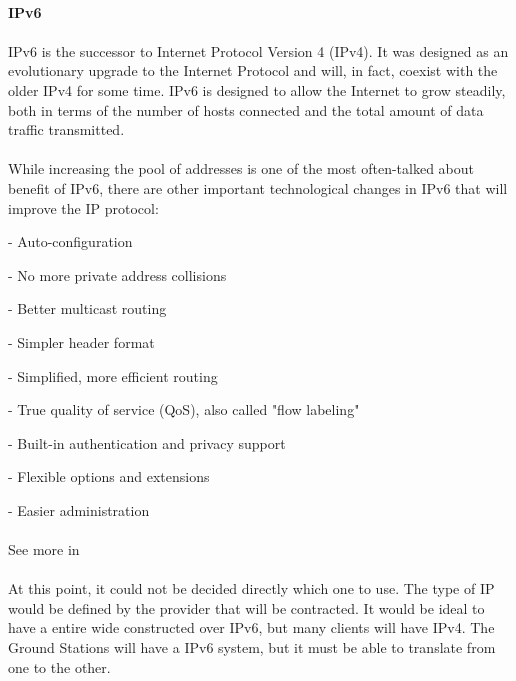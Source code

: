 \paragraph{} \textbf{IPv6}
\paragraph{}
IPv6 is the successor to Internet Protocol Version 4 (IPv4). It was designed as an evolutionary upgrade to the Internet Protocol and will, in fact, coexist with the older IPv4 for some time. IPv6 is designed to allow the Internet to grow steadily, both in terms of the number of hosts connected and the total amount of data traffic transmitted.
\paragraph{}
While increasing the pool of addresses is one of the most often-talked about benefit of IPv6, there are other important technological changes in IPv6 that will improve the IP protocol:
\begin{list}{}{}
\item - Auto-configuration
\item - No more private address collisions
\item - Better multicast routing
\item - Simpler header format
\item - Simplified, more efficient routing
\item - True quality of service (QoS), also called "flow labeling"
\item - Built-in authentication and privacy support
\item - Flexible options and extensions
\item - Easier administration 
\end{list}
\paragraph{}
See more in \cite{IP_TCP_UDP}

\paragraph{}
At this point, it could not be decided directly which one to use. The type of IP would be defined by the provider that will be contracted. It would be ideal to have a entire wide constructed over IPv6, but many clients will have IPv4. The Ground Stations will have a IPv6 system, but it must be able to translate from one to the other.

